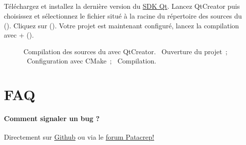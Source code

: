 \subsection{\windows}

Téléchargez et installez la dernière version du
\href{http://qt.nokia.com/downloads}{SDK Qt}. Lancez QtCreator puis
choisissez  et sélectionnez
le fichier  situé à la racine du répertoire des
sources du \client (). Cliquez sur
 (). Votre projet \client
est maintenant configuré, lancez la compilation avec
+ ().

\begin{figure}
  \centering
  \hspace{0.1cm}%
  \hspace{0.1cm}%
  \caption{%
    Compilation des sources du \songbook avec QtCreator.
    ~Ouverture du projet~;%
    ~Configuration avec CMake~;%
    ~Compilation.%
  }%
  \label{fig:qtcreator}
\end{figure}


\section{FAQ}

\paragraph{Comment signaler un bug ?}
Directement sur \href{http://github.com/crep4ever/songbook-client/issues}{Github}
ou via le \href{http://www.patacrep.com/forum/}{forum Patacrep!}

